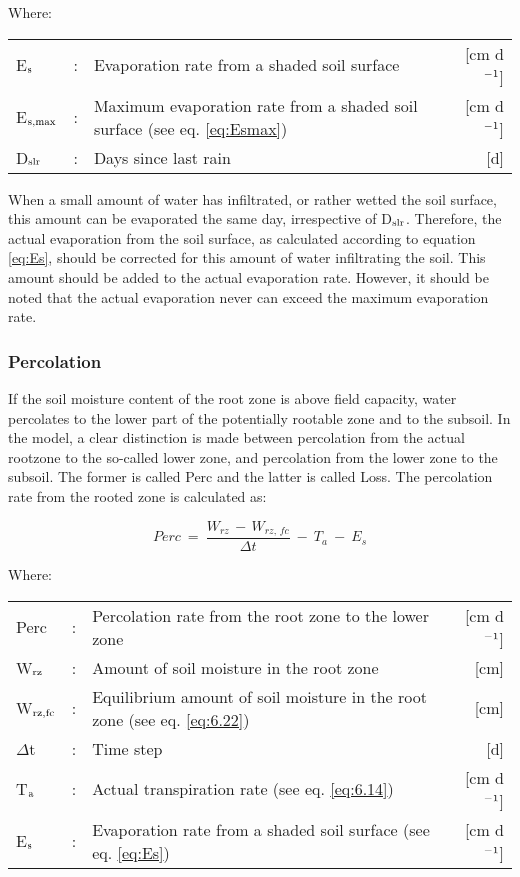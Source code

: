 Where:\\[5pt]
\begin{tabularx}{\textwidth}{llXr}
	E$_{{\rm s}}$ &:& Evaporation rate from a shaded soil surface  & [cm d$^{{\rm -1}}$]\\
	E$_{{\rm s,max}}$ &:& Maximum evaporation rate from a shaded soil
	surface (see eq. \ref{eq:Esmax})  & [cm d$^{{\rm -1}}$]\\
	D$_{{\rm slr}}$ &:& Days since last rain  & [d]\\
\end{tabularx}

When a small amount of water has infiltrated, or rather wetted the soil surface, this
amount can be evaporated the same day, irrespective of D$_{{\rm slr}}$. Therefore, the actual
evaporation from the soil surface, as calculated according to equation \ref{eq:Es}, should be
corrected for this amount of water infiltrating the soil. This amount should be added to
the actual evaporation rate. However, it should be noted that the actual evaporation never
can exceed the maximum evaporation rate.

\subsubsection{Percolation}
If the soil moisture content of the root zone is above field capacity, water percolates to
the lower part of the potentially rootable zone and to the subsoil. In the model, a clear
distinction is made between percolation from the actual rootzone to the so-called lower
zone, and percolation from the lower zone to the subsoil. The former is called Perc and
the latter is called Loss. The percolation rate from the rooted zone is calculated as:

\begin{equation}
\label{eq:6.21}
Perc  ~=~{\frac{W _{rz} \, -\, W _{rz,\, fc} }{\Delta t}} ~-~ T _{a} ~-~ E _{s} 
\end{equation}

Where:\\[5pt]
\begin{tabularx}{\textwidth}{llXr}
	Perc &:& Percolation rate from the root zone to the lower zone  & [cm d$^{{\rm -1}}$]\\
	W$_{{\rm rz}}$ &:& Amount of soil moisture in the root zone  & [cm]\\
	W$_{{\rm rz,fc}}$ &:& Equilibrium amount of soil moisture in the root
	zone (see eq. \ref{eq:6.22})  & [cm]\\
	$\Delta$t &:& Time step  & [d]\\
	T$_{{\rm a}}$ &:& Actual transpiration rate (see eq. \ref{eq:6.14})  & [cm d$^{{\rm -1}}$]\\
	E$_{{\rm s}}$ &:& Evaporation rate from a shaded soil surface 
	(see eq. \ref{eq:Es})  & [cm d$^{{\rm -1}}$]\\
\end{tabularx}

